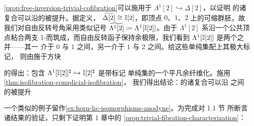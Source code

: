 \begin{example}\label{exa:lifting-hc-composites}
\cref{prop:free-inversion-trivial-cofibration}可以施用于\trAnodyneExtension
$\Lambda^{1}[2]\hookrightarrow\Delta[2]$，以证明\trHomotopyCoherentIsomorphism{}%
的诸复合可以沿\trQuasiCategory{}的\trIsofibration{}被提升。据定义，
$\widetilde{\Delta[2]}\cong\mathbb{I}[2]$，即顶点 $0$、$1$、$2$ 上的可缩群胚，故
我们对自由反转号角采用类似记号 $\widetilde{\Lambda^{1}[2]}\coloneqq\Lambda^{1}[\mathbb{I}[2]]$。由于 $\Lambda^{1}[2]$ 系沿一个公共顶点粘合两支
1-\trSimplex{}而筑成，而自由反转函子保持余极限，我们看到
$\Lambda^{1}[\mathbb{I}[2]]$ 是两个\trHomotopyCoherentIsomorphism{}之并——其一
介于 $0$ 与 $1$ 之间，另一介于 $1$ 与 $2$ 之间。给这些单纯集配上其极大标记，
则由施于方块
\begin{center}
\end{center}
的\trTwoOfThreeProperty{}得出：包含
$\Lambda^{1}[\mathbb{I}[2]]^{\sharp}\hookrightarrow\mathbb{I}[2]^{\sharp}$ 是带标记
单纯集的一个平凡余纤维化。施用\cref{thm:isofibration-complicial-isofibration}，
我们得出结论：\trHomotopyCoherentIsomorphism{}的诸复合可以沿%
\trQuasiCategory{}之间的\trIsofibration{}被提升
\begin{center}
\end{center}
\end{example}

一个类似的例子留作\cref{ex:horn-hc-isomorphisms-anodyne}。为完成对 1.1 节
所断言诸结果的验证，只剩下证明第 1 章中的%
\cref{prop:trivial-fibration-characterization}：

